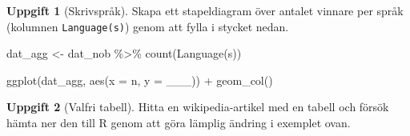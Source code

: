 \documentclass[
]{book}
\newenvironment{Shaded}{\begin{snugshade}}{\end{snugshade}}
\newcommand{\AttributeTok}[1]{\textcolor[rgb]{0.77,0.63,0.00}{#1}}
\newcommand{\FunctionTok}[1]{\textcolor[rgb]{0.00,0.00,0.00}{#1}}
\newcommand{\NormalTok}[1]{#1}
\newcommand{\OtherTok}[1]{\textcolor[rgb]{0.56,0.35,0.01}{#1}}
\newcommand{\SpecialCharTok}[1]{\textcolor[rgb]{0.00,0.00,0.00}{#1}}
\newcommand{\StringTok}[1]{\textcolor[rgb]{0.31,0.60,0.02}{#1}}
\theoremstyle{definition}
\theoremstyle{definition}
\theoremstyle{definition}
\newtheorem{exercise}{Uppgift}[chapter]
\theoremstyle{definition}
\theoremstyle{remark}
\begin{document}
\begin{exercise}[Skrivspråk]

Skapa ett stapeldiagram över antalet vinnare per språk (kolumnen \texttt{Language(s)}) genom att fylla i stycket nedan.

\begin{Shaded}
\begin{Highlighting}[]
\NormalTok{dat\_agg }\OtherTok{\textless{}{-}}\NormalTok{ dat\_nob }\SpecialCharTok{\%\textgreater{}\%} \FunctionTok{count}\NormalTok{(}\StringTok{\textasciigrave{}}\AttributeTok{Language(s)}\StringTok{\textasciigrave{}}\NormalTok{)}

\FunctionTok{ggplot}\NormalTok{(dat\_agg, }\FunctionTok{aes}\NormalTok{(}\AttributeTok{x =}\NormalTok{ n, }\AttributeTok{y =}\NormalTok{ \_\_\_)) }\SpecialCharTok{+}
  \FunctionTok{geom\_col}\NormalTok{()}
\end{Highlighting}
\end{Shaded}

\end{exercise}

\begin{exercise}[Valfri tabell]
Hitta en wikipedia-artikel med en tabell och försök hämta ner den till R genom att göra lämplig ändring i exemplet ovan.
\end{exercise}
\end{document}
